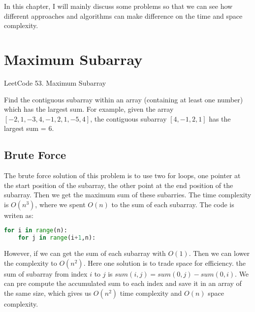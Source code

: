 \documentclass[../algorithms.tex]{subfiles}
\begin{document}
In this chapter, I will mainly discuss some problems so that we can see how different approaches and algorithms can make difference on the time and space complexity.  
\section{Maximum Subarray}
LeetCode 53. Maximum Subarray

Find the contiguous subarray within an array (containing at least one number) which has the largest sum. For example, given the array $[-2,1,-3,4,-1,2,1,-5,4]$, the contiguous subarray $[4,-1,2,1]$ has the largest sum = 6.
\subsection{Brute Force}
The brute force solution of this problem is to use two for loops, one pointer at the start position of the subarray, the other point at the end position of the subarray. Then we get the maximum sum of these subarries. The time complexity is $O(n^3)$, where we spent $O(n)$ to the sum of each subarray. The code is writen as: 
\begin{lstlisting}[language=Python]
for i in range(n):
    for j in range(i+1,n):
\end{lstlisting}
However, if we can get the sum of each subarray with $O(1)$. Then we can lower the complexity to $O(n^2)$. Here one solution is to trade space for efficiency. the sum of subarray from index $i$ to $j$ is $sum(i,j)=sum(0,j)-sum(0,i)$. We can pre compute the accumulated sum to each index and save it in an array of the same size, which gives us $O(n^2)$ time complexity and $O(n)$ space complexity. 
\end{document}
